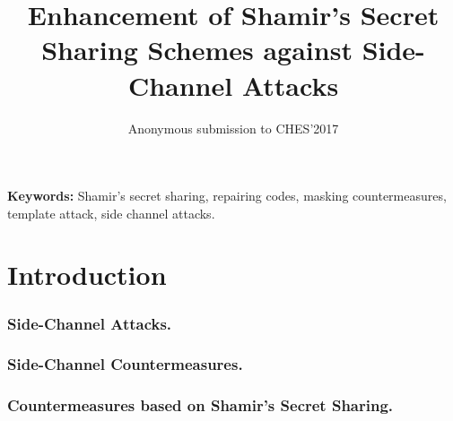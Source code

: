 \documentclass{llncs}
\title{Enhancement of Shamir's Secret Sharing Schemes against Side-Channel Attacks}
\author{Anonymous submission to CHES'2017}
\institute{}
\begin{document}
\maketitle
\begin{abstract}
 \todo{}
\end{abstract}
{\bf Keywords:} Shamir's secret sharing, repairing codes, masking countermeasures, template attack, side channel attacks.
 

\section{Introduction}
\label{sec-intro}

\subsubsection{Side-Channel Attacks.}
 \todo{}
\subsubsection{Side-Channel Countermeasures.} 
 \todo{}
\subsubsection{Countermeasures based on Shamir's Secret Sharing.}
\end{document}
